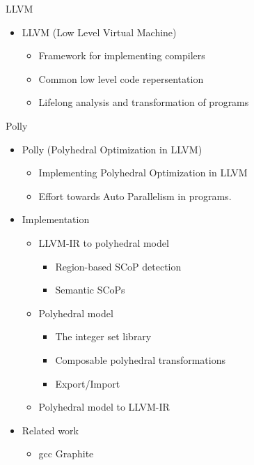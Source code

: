 \documentclass{beamer}
\begin{document}
\begin{frame}{LLVM}
\begin{itemize}
\item LLVM (Low Level Virtual Machine)
	\begin{itemize}
	\item Framework for implementing compilers
	\item Common low level code repersentation
	\item Lifelong analysis and transformation of programs
	\end{itemize}
\end{itemize}
\end{frame}

\begin{frame}[allowframebreaks]{Polly}
\begin{itemize}
\item Polly (Polyhedral Optimization in LLVM)
	\begin{itemize}
	\item Implementing Polyhedral Optimization in LLVM
	\item Effort towards Auto Parallelism in programs.
	\end{itemize}
\item Implementation
	\begin{itemize}
	\item LLVM-IR to polyhedral model
			\begin{itemize}
			\item Region-based SCoP detection
			\item Semantic SCoPs
			\end{itemize}
	\item Polyhedral model
		\begin{itemize}
		\item The integer set library
		\item Composable polyhedral transformations
		\item Export/Import
		\end{itemize}
	\item Polyhedral model to LLVM-IR
	\end{itemize}
\item Related work
	\begin{itemize}
	\item gcc Graphite
	\end{itemize}
\end{itemize}


\end{frame}
\end{document}
